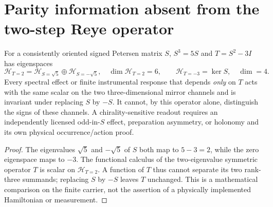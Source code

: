 \documentclass[12pt,a4paper]{article}
\begin{document}
\section{Parity information absent from the two-step Reye operator}
\label{p4a:sec:v340-reye-parity-readout}
\begin{proposition}[Exact spectral blindness of $T=S^2-3I$]
\label{p4a:prop:v340-reye-parity-no-go}
For a consistently oriented signed Petersen matrix $S$,
$S^3=5S$ and $T=S^2-3I$ has eigenspaces
\[
 \mathscr H_{T=2}=\mathscr H_{S=\sqrt5}\oplus
                        \mathscr H_{S=-\sqrt5},
 \quad \dim\mathscr H_{T=2}=6,
 \qquad \mathscr H_{T=-3}=\ker S,\quad\dim=4.
\]
Every spectral effect or finite instrumental response that depends
\emph{only} on $T$ acts with the same scalar on the two three-dimensional
mirror channels and is invariant under replacing $S$ by $-S$.
It cannot, by this operator alone, distinguish the signs of these
channels. A chirality-sensitive readout requires an independently
licensed odd-in-$S$ effect, preparation asymmetry, or holonomy and
its own physical occurrence/action proof.
\end{proposition}
\begin{proof}
The eigenvalues $\sqrt5$ and $-\sqrt5$ of $S$ both map to
$5-3=2$, while the zero eigenspace maps to $-3$.
The functional calculus of the two-eigenvalue symmetric operator
$T$ is scalar on $\mathscr H_{T=2}$. A function of $T$ thus
cannot separate its two rank-three summands; replacing $S$ by
$-S$ leaves $T$ unchanged. This is a mathematical comparison on
the finite carrier, not the assertion of a physically implemented
Hamiltonian or measurement.
\end{proof}
\end{document}
